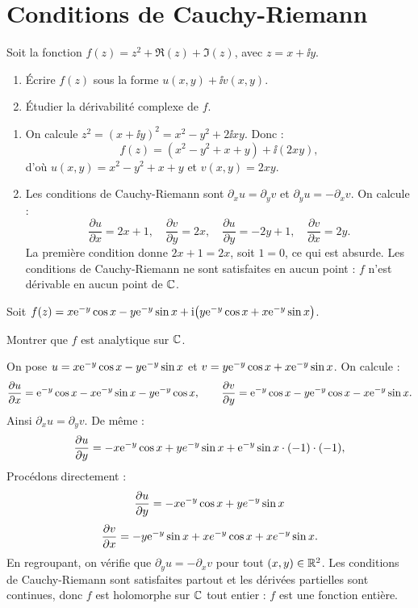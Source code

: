 \documentclass[12pt,a4paper]{article}
\begin{document}
\section{Conditions de Cauchy-Riemann}

\begin{boiteexercice}
\niveau{\facile}
Soit la fonction $f(z) = z^2 + \Re(z) + \Im(z)$, avec $z = x + \ii y$.
\begin{enumerate}
  \item Écrire $f(z)$ sous la forme $u(x,y) + \ii v(x,y)$.
  \item Étudier la dérivabilité complexe de $f$.
\end{enumerate}
\end{boiteexercice}

\begin{boitecorrige}
\begin{enumerate}
\item On calcule $z^2 = (x+\ii y)^2 = x^2 - y^2 + 2\ii xy$. Donc :
\[
f(z) = (x^2-y^2+x+y) + \ii(2xy),
\]
d'où $u(x,y) = x^2 - y^2 + x + y$ et $v(x,y) = 2xy$.

\item Les conditions de Cauchy-Riemann sont $\partial_x u = \partial_y v$ et $\partial_y u = -\partial_x v$. On calcule :
\[
\frac{\partial u}{\partial x} = 2x+1, \quad \frac{\partial v}{\partial y} = 2x, \quad
\frac{\partial u}{\partial y} = -2y+1, \quad \frac{\partial v}{\partial x} = 2y.
\]
La première condition donne $2x+1 = 2x$, soit $1 = 0$, ce qui est absurde. Les conditions de Cauchy-Riemann ne sont satisfaites en aucun point : $f$ n'est dérivable en aucun point de $\mathbb{C}$.
\end{enumerate}
\end{boitecorrige}

\begin{boiteexercice}
\niveau{\moyen}
Soit $f(z) = x\mathrm{e}^{-y}\cos x - y\mathrm{e}^{-y}\sin x + \mathrm{i}\bigl(y\mathrm{e}^{-y}\cos x + x\mathrm{e}^{-y}\sin x\bigr)$.

Montrer que $f$ est analytique sur $\mathbb{C}$.
\end{boiteexercice}

\begin{boitecorrige}
On pose $u = x\mathrm{e}^{-y}\cos x - y\mathrm{e}^{-y}\sin x$ et $v = y\mathrm{e}^{-y}\cos x + x\mathrm{e}^{-y}\sin x$. On calcule :
\[
\frac{\partial u}{\partial x} = \mathrm{e}^{-y}\cos x - x\mathrm{e}^{-y}\sin x - y\mathrm{e}^{-y}\cos x,
\qquad
\frac{\partial v}{\partial y} = \mathrm{e}^{-y}\cos x - y\mathrm{e}^{-y}\cos x - x\mathrm{e}^{-y}\sin x.
\]
Ainsi $\partial_x u = \partial_y v$. De même :
\[
\frac{\partial u}{\partial y} = -x\mathrm{e}^{-y}\cos x + ye^{-y}\sin x + \mathrm{e}^{-y}\sin x\cdot(-1)\cdot(-1),
\]
Procédons directement :
\[
\frac{\partial u}{\partial y} = -x\mathrm{e}^{-y}\cos x + ye^{-y}\sin x
\]
\[
\frac{\partial v}{\partial x} = -y\mathrm{e}^{-y}\sin x + xe^{-y}\cos x + xe^{-y}\sin x.
\]
En regroupant, on vérifie que $\partial_y u = -\partial_x v$ pour tout $(x,y)\in\mathbb{R}^2$. Les conditions de Cauchy-Riemann sont satisfaites partout et les dérivées partielles sont continues, donc $f$ est holomorphe sur $\mathbb{C}$ tout entier : $f$ est une fonction entière.
\end{boitecorrige}
\end{document}

